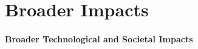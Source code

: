 \documentclass[letterpaper, 11 pt, onecolumn]{article}
\begin{document}









\section{Broader Impacts}\label{sec:impact}


\paragraph*{Broader Technological and Societal Impacts} 
\end{document}
